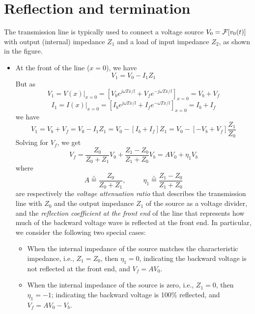 \section*{Reflection and termination}

The transmission line is typically used to connect a voltage source 
$V_0={\cal F}[v_0(t)]$ with output (internal) impedance $Z_1$ and a load 
of input impedance $Z_2$, as shown in the figure. 


\begin{itemize}
\item At the front of the line ($x=0$), we have
  \[	V_1=V_0-I_1Z_1	\]
  But as
  \[ V_1=V(x)|_{x=0}=\left[V_be^{j\omega Tx/l}+V_fe^{-j\omega Tx/l}\right]_{x=0}=V_b+V_f \]
  \[ I_1=I(x)|_{x=0}=\left[I_be^{j\omega Tx/l}+I_fe^{-\omega Tx/l}\right]_{x=0}=I_b+I_f \]
  we have
  \[ V_1=V_b+V_f=V_0-I_1Z_1=V_0-[I_b+I_f]Z_1
  =V_0-[-V_b+V_f]\frac{Z_1}{Z_0}	\]
  Solving for $V_f$, we get
  \[V_f=\frac{Z_0}{Z_0+Z_1}V_0+\frac{Z_1-Z_0}{Z_1+Z_0}V_b
  =AV_0+\eta_1V_b	\]
  where
  \[	A\stackrel{\triangle}{=}\frac{Z_0}{Z_0+Z_1},\;\;\;\;\;\;\;\;\;
  \eta_1\stackrel{\triangle}{=}\frac{Z_1-Z_0}{Z_1+Z_0} \]
  are respectively the {\em voltage attenuation ratio} that describes the 
  transmission line with $Z_0$ and the output impedance $Z_1$ of the source 
  as a voltage divider, and the {\em reflection coefficient at the front end}
  of the line that represents how much of the backward voltage wave is 
  reflected at the front end. In particular, we consider the following two
  special cases:
  \begin{itemize}
  \item When the internal impedance of the source matches the characteristic 
    impedance, i.e., $Z_1=Z_0$, then $\eta_1=0$, 
    indicating the backward voltage is not reflected at the front end, and 
    $V_f=A V_0$.
  \item When the internal impedance of the source is zero, i.e., $Z_1=0$,
    then $\eta_1=-1$; indicating the backward voltage is 100\% reflected,
    and $V_f=AV_0-V_b$.
  \end{itemize}


\end{itemize}
